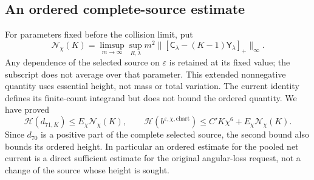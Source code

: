 \subsection{An ordered complete-source estimate}
For parameters fixed before the collision limit, put
\begin{equation}\label{eq:v71-current-height}
 \mathcal N_{\chi}(K)=\limsup_{m\to\infty}\sup_{R,\lambda}
 m^2\bigl\|[\mathsf C_\lambda-(K-1)\mathsf Y_\lambda]_+
                                                        \bigr\|_\infty.
\end{equation}
Any dependence of the selected source on $\varepsilon$ is retained
at its fixed value; the subscript does not average over that parameter.
This extended nonnegative quantity uses essential height, not mass
or total variation. The current identity defines its finite-count
integrand but does not bound the ordered quantity. We have proved
\begin{equation}\label{eq:v71-complete-chart-height}
 \mathcal H(d_{71,K})\le E_\chi\mathcal N_\chi(K),\qquad
 \mathcal H(b^{\varepsilon,\chi,\mathrm{chart}})
                  \le C'K\chi^6+E_\chi\mathcal N_\chi(K).
\end{equation}
Since $d_{70}$ is a positive part of the complete selected source,
the second bound also bounds its ordered height. In particular an
ordered estimate for the pooled net current is a direct sufficient
estimate for the original angular-loss request, not a change of the
source whose height is sought.


